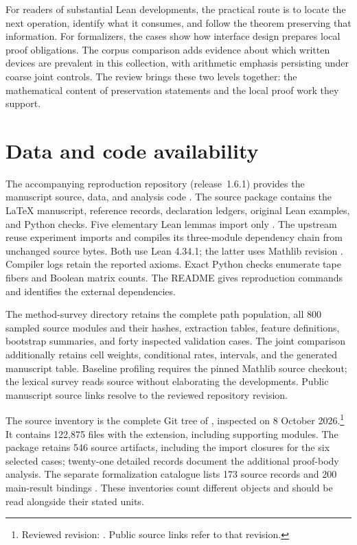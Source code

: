 For readers of substantial Lean developments, the practical route is to
locate the next operation, identify what it consumes, and follow the
theorem preserving that information. For formalizers, the cases show how
interface design prepares local proof obligations. The corpus comparison
adds evidence about which written devices are prevalent in this
collection, with arithmetic emphasis persisting under coarse joint
controls. The review brings these two levels together: the mathematical
content of preservation statements and the local proof work they support.

\section*{Data and code availability}

The accompanying reproduction repository (release~1.6.1) provides the
manuscript source, data, and analysis code \citep{GounderArchitectureData2026}.
The source package contains the LaTeX manuscript, reference records,
declaration ledgers, original Lean examples, and Python checks. Five
elementary Lean lemmas import only . The upstream reuse
experiment imports  and compiles
its three-module dependency chain from unchanged source bytes. Both use
Lean 4.34.1; the latter uses Mathlib revision
. Compiler logs retain the
reported axioms. Exact Python checks enumerate tape fibers and Boolean
matrix counts. The README gives reproduction commands and identifies the
external dependencies.

The method-survey directory retains the complete path population, all
800 sampled source modules and their hashes, extraction tables, feature
definitions, bootstrap summaries, and forty inspected validation cases.
The joint comparison additionally retains cell weights, conditional
rates, intervals, and the generated manuscript table. Baseline profiling
requires the pinned Mathlib source checkout; the lexical survey reads
source without elaborating the developments. Public manuscript source
links resolve to the reviewed repository revision.

The source inventory is the complete Git tree of ,
inspected on 8 October 2026.\footnote{Reviewed revision:
. Public source links refer
to that revision.} It contains 122,875 files with the 
extension, including supporting modules. The package retains 546 source
artifacts, including the  import closures for the six selected
cases; twenty-one detailed records document the additional proof-body
analysis. The separate formalization catalogue lists 173 source records
and 200 main-result bindings \citep{OAICatalog}. These inventories count
different objects and should be read alongside their stated units.

